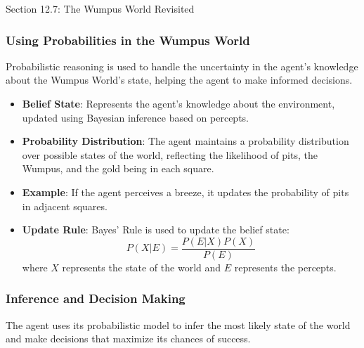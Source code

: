 \begin{notes}{Section 12.7: The Wumpus World Revisited}
\begin{highlight}
    \end{highlight}
    
    \subsubsection*{Using Probabilities in the Wumpus World}
    
    Probabilistic reasoning is used to handle the uncertainty in the agent's knowledge about the Wumpus World's state, helping the agent to make informed decisions.
    
    \begin{highlight}
    
        \begin{itemize}
            \item \textbf{Belief State}: Represents the agent's knowledge about the environment, updated using Bayesian inference based on percepts.
            \item \textbf{Probability Distribution}: The agent maintains a probability distribution over possible states of the world, reflecting the likelihood of pits, the Wumpus, and the gold being 
            in each square.
            \item \textbf{Example}: If the agent perceives a breeze, it updates the probability of pits in adjacent squares.
            \item \textbf{Update Rule}: Bayes' Rule is used to update the belief state:
            \[
            P(X | E) = \frac{P(E | X) P(X)}{P(E)}
            \]
            where $X$ represents the state of the world and $E$ represents the percepts.
        \end{itemize}
    
    \end{highlight}
    
    \subsubsection*{Inference and Decision Making}
    
    The agent uses its probabilistic model to infer the most likely state of the world and make decisions that maximize its chances of success.
    
    \begin{highlight}
    

\end{highlight}
\end{notes}
